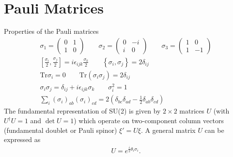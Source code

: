 \documentclass[../main.tex]{subfiles}
\begin{document}
\section{Pauli Matrices}
Properties of the Pauli matrices
\begin{align}
\sigma_1=\left(
\begin{matrix}
0    & 1\\
1 &  0
\end{matrix}
\right)\qquad
\sigma_2=\left(
\begin{matrix}
0    & -i\\
i &  0
\end{matrix}
\right)\qquad
\sigma_3=
\left(
\begin{matrix}
1 & 0\\
1 &  -1
\end{matrix}
\right)\\
%
\left[\frac{\sigma_i}{2},\frac{\sigma_j}{2}\right]=i\epsilon_{ijk}\frac{\sigma_k}{2}\qquad\left\{\sigma_i,\sigma_j\right\}=2\delta_{ij}\\
\mathrm{Tr}\sigma_i=0\qquad\mathrm{Tr}(\sigma_i\sigma_j)=2\delta_{ij}\\
\sigma_i\sigma_j=\delta_{ij}+i\epsilon_{ijk}\sigma_k\qquad\sigma_i^2=1\\
\sum_i(\sigma_i)_{ab}(\sigma_i)_{cd}=2(\delta_{bc}\delta_{ad}-\frac{1}{2}\delta_{ab}\delta_{cd})
\end{align}
The fundamental representation of SU(2) is given by $2\times2$ matrices $U$ (with $U^\dagger U=1$ and $\det U=1$) which operate on two-component column vectors (fundamental doublet or Pauli spinor) $\xi'=U\xi$. A general matrix $U$ can be expressed as
\begin{align}
U=e^{\frac{i}{2}\theta_i\sigma_i}.
\end{align}
\end{document}
